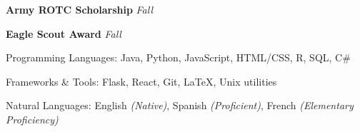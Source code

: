\documentclass[10pt,letterpaper]{article}
\begin{document}
\spacedhrule{0.5em}{-0.4em}


\headedsection
  {\textbf{Army ROTC Scholarship}}
  {\emph{Fall }}
  {}

\headedsection
  {\textbf{Eagle Scout Award}}
  {\emph{Fall }}
  {}

\spacedhrule{0.5em}{-0.4em}


\inlineheadsection
  {Programming Languages:}
  {Java, Python, JavaScript, HTML/CSS, R, SQL, C\#}

\inlineheadsection
  {Frameworks \& Tools:}
  {Flask, React, Git, \LaTeX, Unix utilities}

\inlineheadsection
  {Natural Languages:}
  {English \emph{(Native)}, Spanish \emph{(Proficient)}, French \emph{(Elementary Proficiency)}}
\end{document}
